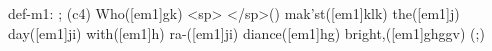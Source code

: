 def-m1: \grealign;
(c4) Who([em1]gk) <sp> </sp>() mak'st([em1]klk) the([em1]j) day([em1]ji) with([em1]h) ra-([em1]ji) diance([em1]hg) bright,([em1]ghggv) (;)